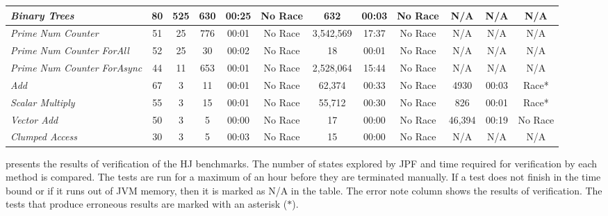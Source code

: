 \begin{table*}
{\begin{tabular}{|m{3.5cm}|c|c|c|c|c|c|c|c|c|c|c|}
\textit{Binary Trees }& 80 & 525 
& 630 & 00:25 & No Race
& 632 & 00:03 & No Race 
& N/A & N/A & N/A \\ \hline

\textit{Prime Num Counter} & 51 & 25
& 776 & 00:01 & No Race
& 3,542,569 & 17:37 & No Race 
& N/A & N/A & N/A \\ \hline

\textit{Prime Num  Counter ForAll}  & 52 & 25
& 30 & 00:02 & No Race
& 18 & 00:01 & No Race
& N/A & N/A & N/A \\ \hline

\textit{Prime Num Counter ForAsync}  & 44 & 11 
& 653 & 00:01 & No Race
& 2,528,064 & 15:44 & No Race 
& N/A & N/A & N/A \\ \hline

\textit{Add}  & 67 & 3 
& 11 & 00:01 & No Race 
& 62,374 & 00:33 & No Race
& 4930 & 00:03 & Race* \\ \hline

\textit{Scalar Multiply}  & 55 & 3 
& 15 & 00:01 & No Race
& 55,712 & 00:30 & No Race 
& 826 & 00:01 & Race* \\ \hline

\textit{Vector Add} & 50 & 3 
& 5 & 00:00 & No Race
& 17 & 00:00 & No Race 
& 46,394 & 00:19 & No Race \\ \hline

\textit{Clumped Access}  & 30 & 3 
& 5 & 00:03 & No Race
& 15 & 00:00 & No Race 
& N/A & N/A & N/A \\ \hline

\end{tabular}}
\vspace{-1em}
\end{table*}

 presents the results of verification of the HJ benchmarks. The number of states explored by JPF and time required for verification by each method is compared. The tests are run for a maximum of an hour before they are terminated manually. If a test does not finish in the time bound or if it runs out of JVM memory, then it is marked as N/A in the table. The error note column shows the results of verification. The tests that produce erroneous results are marked with an asterisk ($\ast$). 

